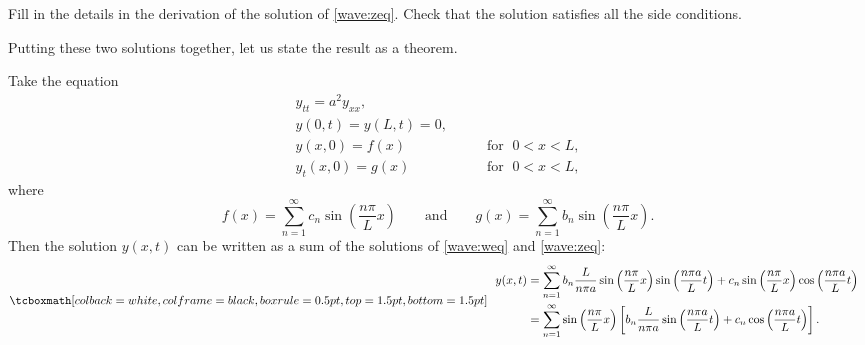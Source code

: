 \begin{exercise}
Fill in the details in the derivation of the solution of \eqref{wave:zeq}.
Check that the solution satisfies all the side conditions.
\end{exercise}

Putting these two solutions together, let us state the result as a theorem.
\begin{theorem}
Take the equation
\begin{equation} \label{wave:tyeq}
\begin{array}{ll}
y_{tt} = a^2 y_{xx} , &  \\
y(0,t) = y(L,t) = 0 , &  \\
y(x,0) = f(x) & \qquad \text{for } \; 0 < x < L , \\
y_t(x,0) = g(x) & \qquad \text{for } \; 0 < x < L ,
\end{array}
\end{equation}
where
\begin{equation*}
f(x) =
\sum_{n=1}^\infty c_n \sin \left( \frac{n \pi}{L} x \right)
\qquad \text{and} \qquad
g(x) =
\sum_{n=1}^\infty b_n \sin \left( \frac{n \pi}{L} x \right) .
\end{equation*}
Then the solution $y(x,t)$ can be written as a sum of the solutions
of \eqref{wave:weq} and \eqref{wave:zeq}:
\begin{equation*}
\mybxbg{~~
\begin{aligned}
y(x,t)
& =
\sum_{n=1}^\infty
b_n
\frac{L}{n \pi a}
\sin \left( \frac{n \pi}{L} x \right)
\sin \left( \frac{n \pi a}{L} t \right) 
+
c_n
\sin \left( \frac{n \pi}{L} x \right)
\cos \left( \frac{n \pi a}{L} t \right) 
\\
& =
\sum_{n=1}^\infty
\sin \left( \frac{n \pi}{L} x \right)
\left[
b_n
\frac{L}{n \pi a}
\sin \left( \frac{n \pi a}{L} t \right) 
+
c_n
\cos \left( \frac{n \pi a}{L} t \right) 
\right] .
\end{aligned}
~~}
\end{equation*}
\end{theorem}

